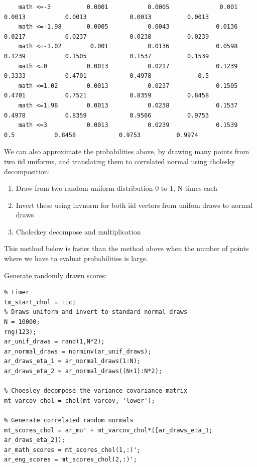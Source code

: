 \documentclass[
]{book}
\begin{document}
\begin{verbatim}
    math <=-3          0.0001           0.0005              0.001           0.0013           0.0013            0.0013          0.0013   
    math <=-1.98       0.0005           0.0043             0.0136           0.0217           0.0237            0.0238          0.0239   
    math <=-1.02        0.001           0.0136             0.0598           0.1239           0.1505            0.1537          0.1539   
    math <=0           0.0013           0.0217             0.1239           0.3333           0.4701            0.4978             0.5   
    math <=1.02        0.0013           0.0237             0.1505           0.4701           0.7521            0.8359          0.8458   
    math <=1.98        0.0013           0.0238             0.1537           0.4978           0.8359            0.9566          0.9753   
    math <=3           0.0013           0.0239             0.1539              0.5           0.8458            0.9753          0.9974   
\end{verbatim}

We can also approximate the probabilities above, by drawing many points
from two iid uniforms, and translating them to correlated normal using
cholesky decomposition:

\begin{enumerate}
\def\labelenumi{\arabic{enumi}.}
\item
  Draw from two random uniform distribution 0 to 1, N times each
\item
  Invert these using invnorm for both iid vectors from unifom draws to
  normal draws
\item
  Choleskey decompose and multiplication
\end{enumerate}

This method below is faster than the method above when the number of
points where we have to evaluat probabilities is large.

Generate randomly drawn scores:

\begin{verbatim}
% timer
tm_start_chol = tic;
% Draws uniform and invert to standard normal draws
N = 10000;
rng(123);
ar_unif_draws = rand(1,N*2);
ar_normal_draws = norminv(ar_unif_draws);
ar_draws_eta_1 = ar_normal_draws(1:N);
ar_draws_eta_2 = ar_normal_draws((N+1):N*2);

% Choesley decompose the variance covariance matrix
mt_varcov_chol = chol(mt_varcov, 'lower');

% Generate correlated random normals
mt_scores_chol = ar_mu' + mt_varcov_chol*([ar_draws_eta_1; ar_draws_eta_2]);
ar_math_scores = mt_scores_chol(1,:)';
ar_eng_scores = mt_scores_chol(2,:)';
\end{verbatim}
\end{document}
